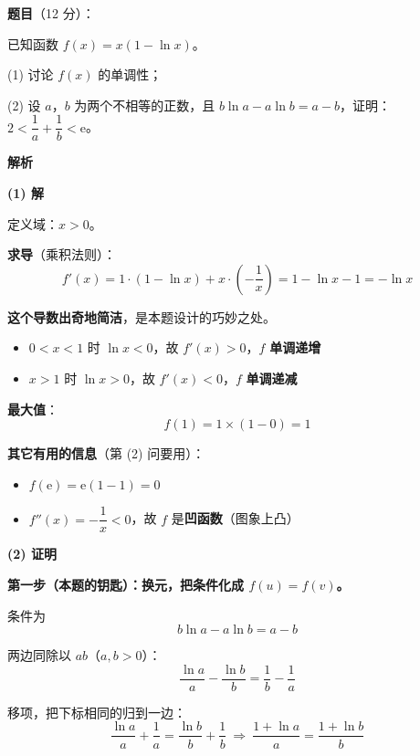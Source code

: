\begin{answer}

\textbf{题目}（12 分）：

已知函数 $f(x)=x(1-\ln x)$。

  (1) 讨论 $f(x)$ 的单调性；

  (2) 设 $a$，$b$ 为两个不相等的正数，且 $b\ln a-a\ln b=a-b$，证明：$2<\dfrac1a+\dfrac1b<\mathrm e$。

\par\medskip

\textbf{解析}

\par\medskip

\textbf{(1) 解}

定义域：$x>0$。

\textbf{求导}（乘积法则）：
\nopagebreak[4]
\[f'(x)=1\cdot(1-\ln x)+x\cdot\left(-\frac1x\right)=1-\ln x-1=-\ln x\]

\textbf{这个导数出奇地简洁}，是本题设计的巧妙之处。

\begin{itemize}
\item $0<x<1$ 时 $\ln x<0$，故 $f'(x)>0$，$f$ \textbf{单调递增}
\item $x>1$ 时 $\ln x>0$，故 $f'(x)<0$，$f$ \textbf{单调递减}
\end{itemize}

\textbf{最大值}：
\nopagebreak[4]
\[f(1)=1\times(1-0)=1\]

\textbf{其它有用的信息}（第 (2) 问要用）：
\begin{itemize}
\item $f(\mathrm e)=\mathrm e(1-1)=0$
\item $f''(x)=-\dfrac1x<0$，故 $f$ 是\textbf{凹函数}（图象上凸）
\end{itemize}

\par\medskip

\textbf{(2) 证明}

\textbf{第一步（本题的钥匙）：换元，把条件化成 $f(u)=f(v)$。}

条件为
\nopagebreak[4]
\[b\ln a-a\ln b=a-b\]

两边同除以 $ab$（$a,b>0$）：
\nopagebreak[4]
\[\frac{\ln a}a-\frac{\ln b}b=\frac1b-\frac1a\]

移项，把下标相同的归到一边：
\nopagebreak[4]
\[\frac{\ln a}a+\frac1a=\frac{\ln b}b+\frac1b\ \Longrightarrow\ \frac{1+\ln a}a=\frac{1+\ln b}b\]


\end{answer}
